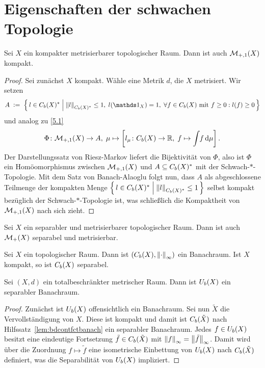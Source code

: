 \documentclass[../main/main.tex]{subfiles}
\begin{document}
	
	\section{Eigenschaften der schwachen Topologie}
	
	\begin{Satz}
		Sei $X$ ein kompakter metrisierbarer topologischer Raum. Dann ist auch $\mathcal{M}_{+,1}(X)$ kompakt.
	\end{Satz}
	
	\begin{proof}
		Sei zunächst $X$ kompakt. Wähle eine Metrik $d$, die $X$ metrisiert.
		Wir setzen
		\[ A \; \defby \; \setcomp{l \in \Bdcontfct{X}^\ast}{\norm{l}_{\Bdcontfct{X}^\ast} \leq 1, \; l(\indfct_{X}) = 1, \; 
			\forall f \in \Bdcontfct{X} \text{ mit } f \geq 0 : l(f) \geq 0}\]
		und analog zu \eqref{5.1}
		\[ \Phi \colon \mathcal{M}_{+,1}(X) \to A, \; \mu \mapsto \left[l_\mu \colon C_b(X) \to \mathbb{R}, \; f \mapsto \int_{} \, f \, \mathrm{d}\mu \right]  \text{.} \]
		Der Darstellungssatz von Riesz-Markov liefert die Bijektivität von $\Phi$, also ist $\Phi$ ein 
		Homöomorphismus zwischen $\mathcal{M}_{+,1}(X)$ und $A \subseteq C_b(X)^\ast$ 
		mit der Schwach-$\ast$-Topologie. Mit dem Satz von Banach-Alaoglu folgt nun, dass $A$ als abgeschlossene Teilmenge der kompakten Menge 
		$\left\{\, l \in C_b(X)^\ast \; \middle| \; \left\lVert l\right\rVert_{C_b(X)^\ast} \leq 1 \,\right\}$ selbst kompakt bezüglich der Schwach-$\ast$-Topologie ist, 
		was schließlich die Kompaktheit von $\mathcal{M}_{+,1}(X)$ nach sich zieht.
	\end{proof}
	
	\begin{Satz}
		\label{thm:finitemeasuresmetrizableseparable}
		Sei $X$ ein separabler und metrisierbarer topologischer Raum. Dann ist auch $\mathcal{M}_{+}(X)$ separabel und metrisierbar.
	\end{Satz}
	
	\begin{Hilfssatz}
		\label{lem:bdcontfctbanach}
		Sei $X$ ein topologischer Raum. Dann ist $(C_b(X), \left\lVert\cdot\right\rVert_\infty)$ ein Banachraum. Ist $X$ kompakt, so ist $C_b(X)$ separabel.
	\end{Hilfssatz}
	
	\begin{Hilfssatz}
		\label{lem:bduniffctbanach}
		Sei $(X, d)$ ein totalbeschränkter metrischer Raum. Dann ist $U_b(X)$ ein separabler Banachraum.
	\end{Hilfssatz}
	
	\begin{proof}
		Zunächst ist $U_b(X)$ offensichtlich ein Banachraum.
		Sei nun $\tilde{X}$ die Vervollständigung von $X$. Diese ist kompakt und damit ist $C_b(\tilde{X})$ nach Hilfssatz~\ref{lem:bdcontfctbanach} ein separabler Banachraum.
		Jedes $f \in U_b(X)$ besitzt eine eindeutige Fortsetzung $\tilde{f} \in C_b(\tilde{X})$ mit $\left\lVert f\right\rVert_\infty = \left\lVert\tilde{f}\right\rVert_\infty$. Damit wird über die Zuordnung
		$f \mapsto \tilde{f}$ eine isometrische Einbettung von $U_b(X)$ nach $C_b(\tilde{X})$ definiert, was die Separabilität von $U_b(X)$ impliziert.
	\end{proof}
	
\end{document}
